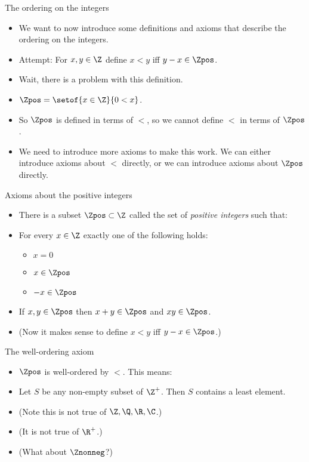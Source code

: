 \documentclass[handout]{beamer}
\begin{document}
\begin{frame}{The ordering on the integers}

\begin{itemize}
  \item We want to now introduce some definitions and axioms that describe the
  ordering on the integers.
  \item Attempt: For $x,y\in\Z$ define $x<y$ iff $y-x\in\Zpos$.
  \item Wait, there is a problem with this definition.
  \item $\Zpos = \setof{x\in\Z}{0<x}$.
  \item So $\Zpos$ is defined in terms of $<$, so we cannot define $<$ in terms of $\Zpos$.
  \item We need to introduce more axioms to make this work. We can either introduce
  axioms about $<$ directly, or we can introduce axioms about $\Zpos$ directly.
\end{itemize}
\end{frame}

\begin{frame}{Axioms about the positive integers}

\begin{itemize}
  \item There is a subset $\Zpos\subset\Z$ called the set of \emph{positive integers} such that:
  \item For every $x\in\Z$ exactly one of the following holds:
    \begin{itemize}
      \item $x=0$
      \item $x\in\Zpos$
      \item $-x\in\Zpos$
    \end{itemize}
  \item If $x,y\in\Zpos$ then $x+y\in\Zpos$ and $xy\in\Zpos$.
  \item (Now it makes sense to define $x<y$ iff $y-x\in\Zpos$.)
\end{itemize}

\end{frame}

\begin{frame}{The well-ordering axiom}

\begin{itemize}
  \item  $\Zpos$ is well-ordered by $<$. This means:
  \item Let $S$ be any non-empty subset of $\Z^+$. Then $S$ contains
  a least element.
  \item (Note this is not true of $\Z,\Q,\R,\C$.)
  \item (It is not true of $\R^+$.)
  \item (What about $\Znonneg$?)
\end{itemize}

\end{frame}
\end{document}
